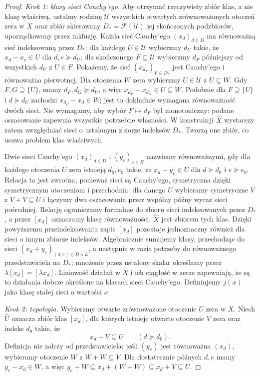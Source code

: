 \documentclass[11pt,a4paper]{article}
\numberwithin{equation}{section}
\theoremstyle{plain}
\theoremstyle{definition}
\theoremstyle{remark}
\begin{document}
\begin{proof}
\emph{Krok 1: klasy sieci Cauchy'ego.}
Aby otrzymać rzeczywisty zbiór klas, a nie klasę właściwą,
ustalmy rodzinę $\mathcal U$ wszystkich otwartych zrównoważonych
otoczeń zera w $X$ oraz zbiór skierowany
$D_*=\mathcal F(\mathcal U)$ jej skończonych podzbiorów,
uporządkowany przez inkluzję. Każda sieć Cauchy'ego $(x_d)_{d\in D}$
ma równoważną sieć indeksowaną przez $D_*$: dla każdego
$U\in\mathcal U$ wybierzmy $d_U$ takie, że
$x_d-x_e\in U$ dla $d,e\succeq d_U$; dla skończonego
$F\subseteq\mathcal U$ wybierzmy $d_F$ późniejszy od wszystkich
$d_U$ z $U\in F$. Pokażemy, że sieć $(x_{d_F})_{F\in D_*}$
jest Cauchy'ego i równoważna pierwotnej. Dla otoczenia
$W$ zera wybierzmy $U\in\mathcal U$ z $U\subseteq W$.
Gdy $F,G\supseteq\{U\}$, mamy $d_F,d_G\succeq d_U$,
a więc $x_{d_F}-x_{d_G}\in U\subseteq W$.
Podobnie dla $F\supseteq\{U\}$ i $d\succeq d_U$
zachodzi $x_{d_F}-x_d\in W$; jest to dokładnie
wymagana równoważność dwóch sieci. Nie wymagamy,
aby wybór $F\mapsto d_F$ był monotoniczny: podane
oszacowanie zapewnia wszystkie potrzebne własności.
W konstrukcji $\widehat X$ wystarczy zatem uwzględniać
sieci o ustalonym zbiorze indeksów $D_*$. Tworzą one
zbiór, co usuwa problem klas właściwych.

Dwie sieci Cauchy'ego $(x_d)_{d\in D}$ i $(y_e)_{e\in E}$
nazwiemy równoważnymi, gdy dla każdego otoczenia $U$ zera
istnieją $d_0,e_0$ takie, że
$x_d-y_e\in U$ dla $d\succeq d_0$ i $e\succeq e_0$.
Relacja ta jest zwrotna, ponieważ sieci są Cauchy'ego,
symetryczna dzięki symetrycznym otoczeniom i przechodnia:
dla danego $U$ wybieramy symetryczne $V$ z $V+V\subseteq U$
i łączymy dwa oszacowania przez wspólny późny wyraz
sieci pośredniej. Relację ograniczamy formalnie do zbioru sieci indeksowanych
przez $D_*$, a przez $[x_d]$ oznaczamy klasę
równoważności; $\widehat X$ jest zbiorem tych klas.
Dzięki powyższemu przeindeksowaniu zapis $[x_d]$
pozostaje jednoznaczny również dla sieci o innym zbiorze
indeksów. Algebraicznie sumujemy klasy, przechodząc do sieci
$(x_d+y_e)_{(d,e)\in D\times E}$, a następnie w razie potrzeby
do równoważnego przedstawiciela na $D_*$;
mnożenie przez ustalony skalar określamy przez
$\lambda[x_d]=[\lambda x_d]$. Liniowość działań w $X$
i ich ciągłość w zerze zapewniają, że są to działania
dobrze określone na klasach sieci Cauchy'ego.
Definiujemy $j(x)$ jako klasę stałej sieci o wartości $x$.

\emph{Krok 2: topologia.}
Wybierzmy otwarte zrównoważone otoczenie $U$ zera w $X$.
Niech $\widehat U$ oznacza zbiór klas $[x_d]$, dla których
istnieje otwarte otoczenie $V$ zera oraz indeks $d_0$ takie, że
\[
       x_d+V\subseteq U\qquad(d\succeq d_0).
\]
Definicja nie zależy od przedstawiciela: jeśli $(y_e)$
jest równoważna $(x_d)$, wybieramy otoczenie $W$ z
$W+W\subseteq V$. Dla dostatecznie późnych $d,e$
mamy $y_e-x_d\in W$, a więc
$y_e+W\subseteq x_d+(W+W)\subseteq x_d+V\subseteq U$.


\end{proof}
\end{document}
